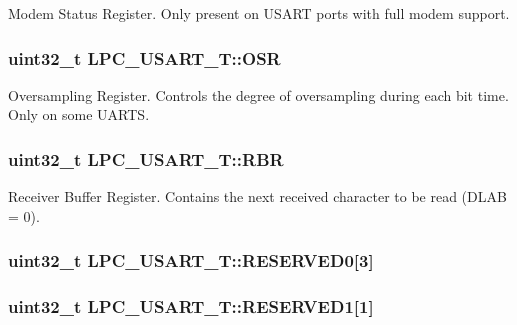 Modem Status Register. Only present on U\-S\-A\-R\-T ports with full modem support. \hypertarget{structLPC__USART__T_abd99c522dd0ccec4b7c7b1c08cc3c1fb}{
\subsubsection[{O\-S\-R}]{ uint32\-\_\-t L\-P\-C\-\_\-\-U\-S\-A\-R\-T\-\_\-\-T\-::\-O\-S\-R}}\label{structLPC__USART__T_abd99c522dd0ccec4b7c7b1c08cc3c1fb}
Oversampling Register. Controls the degree of oversampling during each bit time. Only on some U\-A\-R\-T\-S. \hypertarget{structLPC__USART__T_a39191d418ae7de55f62202f25fd29083}{
\subsubsection[{R\-B\-R}]{ uint32\-\_\-t L\-P\-C\-\_\-\-U\-S\-A\-R\-T\-\_\-\-T\-::\-R\-B\-R}}\label{structLPC__USART__T_a39191d418ae7de55f62202f25fd29083}
Receiver Buffer Register. Contains the next received character to be read (D\-L\-A\-B = 0). \hypertarget{structLPC__USART__T_af3789f39fe00cc53f3055507eb9eb52c}{
\subsubsection[{R\-E\-S\-E\-R\-V\-E\-D0}]{\setlength{\rightskip}{0pt plus 5cm}uint32\-\_\-t L\-P\-C\-\_\-\-U\-S\-A\-R\-T\-\_\-\-T\-::\-R\-E\-S\-E\-R\-V\-E\-D0\mbox{[}3\mbox{]}}}\label{structLPC__USART__T_af3789f39fe00cc53f3055507eb9eb52c}
\hypertarget{structLPC__USART__T_a56453758b5fec0a80c808f746e3db741}{
\subsubsection[{R\-E\-S\-E\-R\-V\-E\-D1}]{ uint32\-\_\-t L\-P\-C\-\_\-\-U\-S\-A\-R\-T\-\_\-\-T\-::\-R\-E\-S\-E\-R\-V\-E\-D1\mbox{[}1\mbox{]}}}\label{structLPC__USART__T_a56453758b5fec0a80c808f746e3db741}
